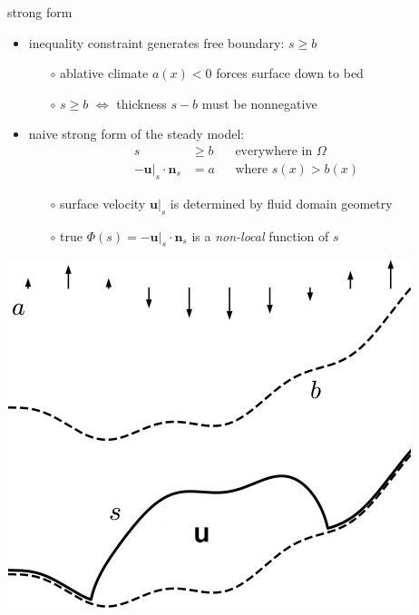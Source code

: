 \documentclass[svgnames,
               hyperref={colorlinks,citecolor=DeepPink4,linkcolor=FireBrick,urlcolor=Maroon},
               usepdftitle=false]  %
               {beamer}
\newcommand{\bn}{\mathbf{n}}
\newcommand{\bu}{\mathbf{u}}
\begin{document}
\begin{frame}{strong form}

\begin{itemize}
\item inequality constraint generates free boundary: $s \ge b$
    \begin{itemize}
    \item[$\circ$] ablative climate $a(x) < 0$ forces surface down to bed
    \item[$\circ$] $s\ge b$ $\iff$ thickness $s-b$ must be nonnegative
    \end{itemize}
\item naive strong form of the steady model: %
\begin{align*}
s &\ge b                    & &\text{everywhere in } \Omega \\
-\bu|_s \cdot \bn_s &= a    & &\text{where } s(x) > b(x)
\end{align*}

    \begin{itemize}
    \item[$\circ$] surface velocity $\bu|_s$ is determined by fluid domain geometry
    \item[$\circ$] true $\Phi(s) = -\bu|_s \cdot \bn_s$ is a \emph{non-local} function of $s$
    \end{itemize}
\end{itemize}

\bigskip
\hfill \mbox{\includegraphics[height=0.2\textheight]{images/domain-data.png} \hspace{7mm} \includegraphics[height=0.2\textheight]{images/domain-velocity.png}}
\end{frame}
\end{document}
